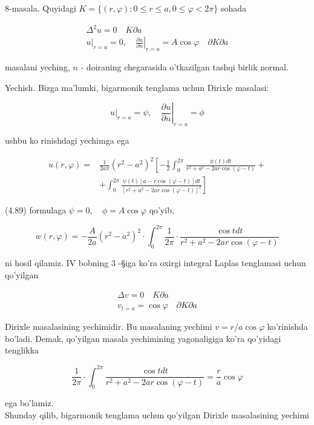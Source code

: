 \documentclass[10pt]{article}
\begin{document}
8-masala. Quyidagi $K=\{(r, \varphi): 0 \leq r \leq a, 0 \leq \varphi<2 \pi\}$ sohada

$$
\begin{gathered}
\Delta^{2} u=0 \quad K \partial a \\
\left.u\right|_{r=a}=0,\left.\quad \frac{\partial u}{\partial n}\right|_{r=a}=A \cos \varphi \quad \partial K \partial a
\end{gathered}
$$

masalani yeching, $n$ - doiraning chegarasida o'tkazilgan tashqi birlik normal.

Yechish. Bizga ma'lumki, bigarmonik tenglama uchun Dirixle masalasi:

$$
\left.u\right|_{r=a}=\psi,\left.\quad \frac{\partial u}{\partial n}\right|_{r=a}=\phi
$$

ushbu ko rinishdagi yechimga ega


\begin{align*}
u(r, \varphi)= & \frac{1}{2 a \pi}\left(r^{2}-a^{2}\right)^{2}\left[-\frac{1}{2} \int_{0}^{2 \pi} \frac{\phi(t) d t}{r^{2}+a^{2}-2 a r \cos (\varphi-t)}+\right. \\
& \left.+\int_{0}^{2 \pi} \frac{\psi(t)[a-r \cos (\varphi-t)] d t}{\left[r^{2}+a^{2}-2 a r \cos (\varphi-t)\right]^{2}}\right] \tag{4.89}
\end{align*}


(4.89) formulaga $\psi=0, \quad \phi=A \cos \varphi$ qo'yib,

$$
w(r, \varphi)=-\frac{A}{2 a}\left(r^{2}-a^{2}\right)^{2} \cdot \int_{0}^{2 \pi} \frac{1}{2 \pi} \cdot \frac{\cos t d t}{r^{2}+a^{2}-2 a r \cos (\varphi-t)}
$$

ni hosil qilamiz. IV bobning 3 -§iga ko'ra oxirgi integral Laplas tenglamasi uchun qo'yilgan

$$
\begin{gathered}
\Delta v=0 \quad K \partial a \\
v_{t=a}=\cos \varphi \quad \partial K \partial a
\end{gathered}
$$

Dirixle masalasining yechimidir. Bu masalaning yechimi $v=r / a \cos \varphi$ ko'rinishda bo'ladi. Demak, qo'yilgan masala yechimining yagonaligiga ko'ra qo'yidagi tenglikka

$$
\frac{1}{2 \pi} \cdot \int_{0}^{2 \pi} \frac{\cos t d t}{r^{2}+a^{2}-2 a r \cos (\varphi-t)}=\frac{r}{a} \cos \varphi
$$

ega bo'lamiz.\\
Shunday qilib, bigarmonik tenglama uchun qo'yilgan Dirixle masalasining yechimi
\end{document}
